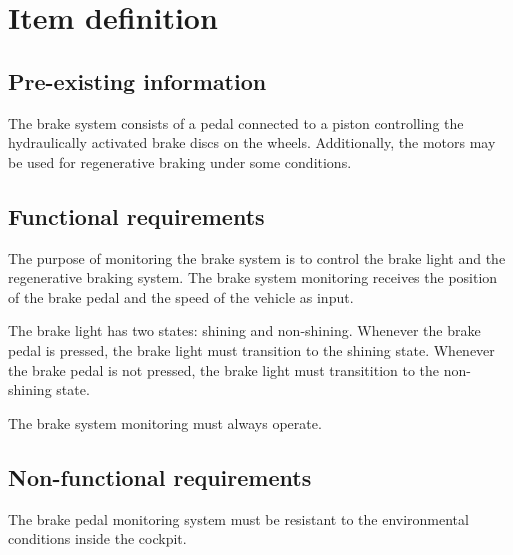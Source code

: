 \section{Item definition}

\subsection{Pre-existing information}
The brake system consists of a pedal connected to a piston controlling the hydraulically activated brake discs on the wheels.
Additionally, the motors may be used for regenerative braking under some conditions.

\subsection{Functional requirements}
%
%
The purpose of monitoring the brake system is to control the brake light and the regenerative braking system.
The brake system monitoring receives the position of the brake pedal and the speed of the vehicle as input.

The brake light has two states: shining and non-shining.
Whenever the brake pedal is pressed, the brake light must transition to the shining state.
Whenever the brake pedal is not pressed, the brake light must transitition to the non-shining state.

The brake system monitoring must always operate.

\subsection{Non-functional requirements}
%
%
%
The brake pedal monitoring system must be resistant to the environmental conditions inside the cockpit.

